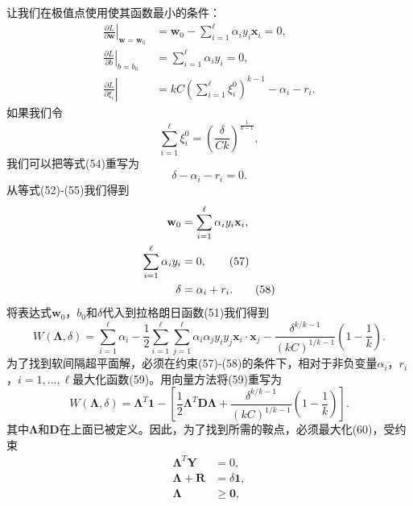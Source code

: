 \documentclass[lang=cn,11pt,a4paper]{elegantpaper}
\begin{document}
	让我们在极值点使用使其函数最小的条件：
	\begin{align}
		\left.\frac{\partial L}{\partial \mathbf{w}}\right|_{\mathbf{w}=\mathbf{w}_0}&=\mathbf{w}_0-\sum_{i=1}^{\ell} \alpha_i y_i \mathbf{x}_i=0,\tag{52} \\
		\left.\frac{\partial L}{\partial b}\right|_{b=b_0}&=\sum_{i=1}^\ell\alpha_iy_i=0,\tag{53} \\
		\left.\frac{\partial L}{\partial \xi_i}\right|&=kC\left(\sum_{i=1}^\ell\xi_i^0\right)^{k-1}-\alpha_i-r_i.\tag{54}
	\end{align}
	如果我们令
	\begin{equation}
		\sum_{i=1}^\ell\xi_i^0=\left(\frac{\delta}{Ck}\right)^{\frac{1}{k-1}},\tag{55}
	\end{equation}
	我们可以把等式(54)重写为
	\begin{equation}
		\delta-\alpha_i-r_i=0.\tag{56}
	\end{equation}
	从等式(52)-(55)我们得到
	\begin{align}
		\mathbf{w}_0&=\sum_{i=1}^\ell\alpha_iy_i\mathbf{x}_i,\notag \\
		\sum_{i=1}^\ell\alpha_iy_i&=0,\tag{57} \\
		\delta&=\alpha_i+r_i.\tag{58}
	\end{align}
	将表达式$\mathbf{w}_0$，$b_0$和$\delta$代入到拉格朗日函数(51)我们得到
	\begin{equation}
		W(\mathbf{\Lambda}, \delta)=\sum_{i=1}^{\ell} \alpha_{i}-\frac{1}{2} \sum_{i=1}^{\ell} \sum_{j=1}^{\ell} \alpha_{i} \alpha_{j} y_{i} y_{j} \mathbf{x}_{i} \cdot \mathbf{x}_{j}-\frac{\delta^{k / k-1}}{(k C)^{1 / k-1}}\left(1-\frac{1}{k}\right).\tag{59}
	\end{equation}
	为了找到软间隔超平面解，必须在约束(57)-(58)的条件下，相对于非负变量$\alpha_i$，$r_i$，$i=1,\dots,\ell$最大化函数(59)。用向量方法将(59)重写为
	\begin{equation}
		W(\mathbf{\Lambda}, \delta)=\mathbf{\Lambda}^{T} \mathbf{1}-\left[\frac{1}{2} \mathbf{\Lambda}^{T} \mathbf{D} \mathbf{\Lambda}+\frac{\delta^{k / k-1}}{(k C)^{1 / k-1}}\left(1-\frac{1}{k}\right)\right].\tag{60}
	\end{equation}
	其中$\mathbf{\Lambda}$和$\mathbf{D}$在上面已被定义。因此，为了找到所需的鞍点，必须最大化(60)，受约束
	\begin{align}
		\mathbf{\Lambda}^T\mathbf{Y}&=0,\tag{61} \\
		\mathbf{\Lambda}+\mathbf{R}&=\delta\mathbf{1},\tag{62} \\
		\mathbf{\Lambda}&\geq\mathbf{0},\tag{63}
	\end{align}
\end{document}
